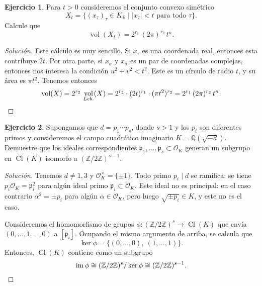 \documentclass{article}
\newcounter{tarea}
\theoremstyle{definition}
\newtheorem{ejercicio}{Ejercicio}[tarea]
\newenvironment{solucion}{\begin{proof}[Solución]}{\end{proof}}
\DeclareMathOperator{\Cl}{Cl}
\DeclareMathOperator{\im}{im}
\DeclareMathOperator{\vol}{vol}
\newcommand{\ZZ}{\mathbb{Z}}
\newcommand{\QQ}{\mathbb{Q}}
\newcommand{\RR}{\mathbb{R}}
\renewcommand{\O}{\mathcal{O}}
\begin{document}
\begin{ejercicio}
  Para $t > 0$ consideremos el conjunto convexo simétrico
  $$X_t = \{ (x_\tau)_\tau \in K_\RR \mid |x_\tau| < t\text{ para todo }\tau \}.$$
  Calcule que
  $$\vol (X_t) = 2^{r_1}\,(2\pi)^{r_2}\,t^n.$$

  \ifdefined\solutions
  \begin{solucion}
    Este cálculo es muy sencillo. Si $x_\tau$ es una coordenada real, entonces
    esta contribuye $2t$. Por otra parte, si $x_\sigma$ y
    $x_{\overline{\sigma}}$ es un par de coordenadas complejas, entonces nos
    interesa la condición $u^2 + v^2 < t^2$. Este es un círculo de radio $t$, y
    su área es $\pi t^2$. Tenemos entonces
    \[ \vol (X) = 2^{r_2}\,\vol_{Leb.} (X) =
      2^{r_2}\cdot (2t)^{r_1}\cdot (\pi t^2)^{r_2} =
      2^{r_1}\,(2\pi)^{r_2}\,t^n. \qedhere \]
  \end{solucion}
  \fi
\end{ejercicio}

\begin{ejercicio}
  Supongamos que $d = p_1\cdots p_s$, donde $s > 1$ y los $p_i$ son diferentes
  primos y consideremos el campo cuadrático imaginario $K = \QQ (\sqrt{-d})$.
  Demuestre que los ideales correspondientes
  $\mathfrak{p}_1,\ldots,\mathfrak{p}_s \subset \O_K$ generan un subgrupo en
  $\Cl (K)$ isomorfo a $(\ZZ/2\ZZ)^{s-1}$.

  \ifdefined\solutions
  \begin{solucion}
    Tenemos $d \ne 1,3$ y $\O_K^\times = \{ \pm 1 \}$. Todo primo $p_i \mid d$
    se ramifica: se tiene $p_i\O_K = \mathfrak{p}_i^2$ para algún ideal primo
    $\mathfrak{p}_i \subset \O_K$. Este ideal no es principal: en el caso
    contrario $\alpha^2 = \pm p_i$ para algún $\alpha \in \O_K$, pero luego
    $\sqrt{\pm p_i} \in K$, y este no es el caso.

    Consideremos el homomorfismo de grupos $\phi\colon (\ZZ/2\ZZ)^s \to \Cl (K)$
    que envía $(0,\ldots,1,\ldots,0)$ a $[\mathfrak{p}_i]$. Ocupando el mismo
    argumento de arriba, se calcula que
    $$\ker \phi = \{ (0,\ldots,0), ~ (1,\ldots,1) \}.$$
    Entonces, $\Cl (K)$ contiene como un subgrupo
    \[ \im \phi \cong (\ZZ/2\ZZ)^s/\ker\phi \cong (\ZZ/2\ZZ)^{s-1}. \qedhere \]
  \end{solucion}
  \fi
\end{ejercicio}
\end{document}
